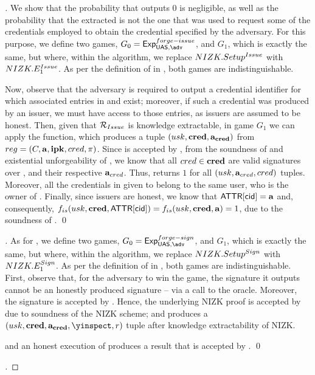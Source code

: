 \begin{proof}[]
  We show that the probability that \fissue outputs $0$ is negligible, as well
  as the probability that the extracted \usk is not the one that was used to
  request some of the credentials employed to obtain the credential specified by
  the adversary.
  For this purpose, we define two games, $G_0=\ExpForgeIssue$, and $G_1$, which
  is exactly the same, but where, within the \Setup algorithm, we replace
  $NIZK.Setup^{Issue}$ with $NIZK.E_1^{Issue}$. As per the definition of
  \NIZK in , both games are indistinguishable.

  Now, observe that the adversary is required to output a credential
  identifier for which associated entries in \trans and \CRED exist; moreover,
  if such a credential was produced by an issuer, we must have access to those
  entries, as issuers are assumed to be honest.
  Then, given that $\mathcal{R}_{Issue}$ is knowledge extractable, in game $G_1$
  we can apply the \NIZKExtII function, which produces a tuple $(usk,\mathbf{cred},
  \mathbf{a}_{\mathbf{cred}})$ from $reg = (C,\mathbf{a},\mathbf{ipk},cred,\pi)$.
  Since \NIZKproof is accepted by \ExtractIssue, from the soundness of \NIZK and
  existential unforgeability of \SBCM, we know that all $cred \in \mathbf{cred}$ are
  valid signatures over \usk, and their respective $\mathbf{a}_{cred}$. Thus,
  \Identify returns $1$ for all $(usk,\mathbf{a}_{cred},cred)$ tuples.
  Moreover, all the credentials in \scred given to \fissue belong to the same
  user, who is the owner of \usk.
  Finally, since issuers are honest, we know that $\mathsf{ATTR}[\mathsf{cid}] = \mathbf{a}$ and,
  consequently, $f_{is}(usk,\mathbf{cred},\mathsf{ATTR}[\mathsf{cid}]) = f_{is}(usk,\mathbf{cred},\mathbf{a})
  = 1$, due to the soundness of \NIZK.
  \qed
\end{proof}

\begin{theorem}
  \label{thm:sign-forge-uas}  
\end{theorem}

\begin{proof}[]
  As for , we define two games, $G_0=\ExpForgeSign$,
  and $G_1$, which is exactly the same, but where, within the \Setup algorithm,
  we replace $NIZK.Setup^{Sign}$ with $NIZK.E_1^{Sign}$. As per the
  definition of \NIZK in , both games are indistinguishable.
  First, observe that, for the adversary to win the game, the signature it
  outputs cannot be an honestly produced signature -- via a call to the \SIGN
  oracle. Moreover, the signature is accepted by \Verify. Hence, the underlying
  NIZK proof \NIZKproof is accepted by \NIZKVerify due to soundness of the
  NIZK scheme; and \NIZKExtII produces a $(\usk,\scred,\attrs_{\scred},
  \yinspect,r)$ tuple after knowledge extractability of NIZK.

  and an honest
  execution of \Inspect produces a result that is accepted by \Judge.
  \qed
\end{proof}

\begin{theorem}
  \label{thm:frame-uas}
\end{theorem}

\begin{proof}[]
\end{proof}


